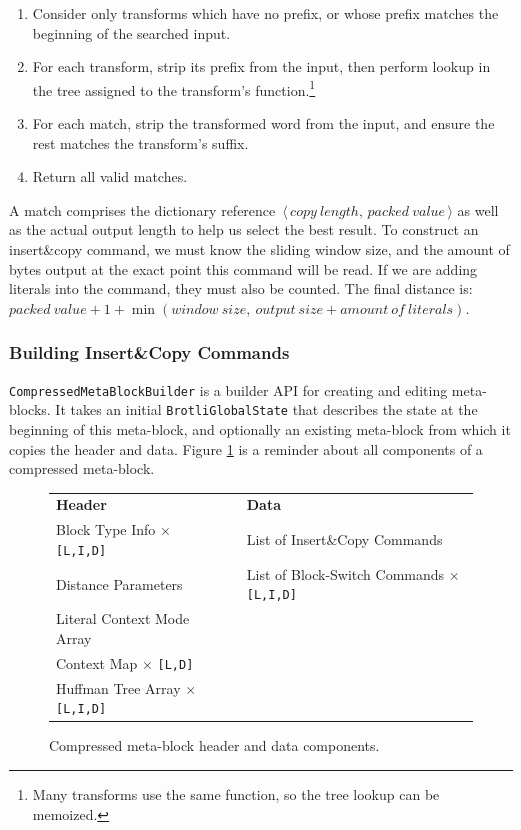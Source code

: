 \documentclass[english,master,dept460,male,cpp,cpdeclaration]{diploma}
\newcommand{\nosep}{\itemsep0em}
\newcommand{\pair}[2]{$\,\langle\,#1,\,#2\,\rangle$}
\begin{document}
			\begin{enumerate} \nosep
				\item Consider only transforms which have no prefix, or whose prefix matches the beginning of the searched input.
				\item For each transform, strip its prefix from the input, then perform lookup in the tree assigned to the transform's function.\footnote{Many transforms use the same function, so the tree lookup can be memoized.}
				\item For each match, strip the transformed word from the input, and ensure the rest matches the transform's suffix.
				\item Return all valid matches.
			\end{enumerate}
			
			\noindent
			A match comprises the dictionary reference \pair{copy\ length}{packed\ value} as well as the actual output length to help us select the best result. To construct an insert\&copy command, we must know the sliding window size, and the amount of bytes output at the exact point this command will be read. If we are adding literals into the command, they must also be counted. The final distance is: $packed\ value + 1 + \min (window\ size,\ output\ size + amount\ of\ literals)$.
		
		\subsubsection{Building Insert\&Copy Commands}
		\label{sec:building-insert-copy-commands}
		
		\verb|CompressedMetaBlockBuilder| is a builder API for creating and editing meta-blocks. It takes an initial \verb|BrotliGlobalState| that describes the state at the beginning of this meta-block, and optionally an existing meta-block from which it copies the header and data. Figure \ref{fig:compressed-meta-block-components-reminder} is a reminder about all components of a compressed meta-block.
		
		\begin{figure}[H]
			\centering
			\medskip
			
			\begin{tabular}{lcl}
				\textbf{Header} & & \textbf{Data} \\
				\addlinespace
				\cline{1-1} \cline{3-3}
				\addlinespace
				Block Type Info $\times$ \verb|[L,I,D]|    & & List of Insert\&Copy Commands \\
				Distance Parameters                        & & List of Block-Switch Commands $\times$ \verb|[L,I,D]| \\
				Literal Context Mode Array                 & & \\
				Context Map $\times$ \verb|[L,D]|          & & \\
				Huffman Tree Array $\times$ \verb|[L,I,D]| & & \\
			\end{tabular}
			
			\caption{Compressed meta-block header and data components.}
			\label{fig:compressed-meta-block-components-reminder}
		\end{figure}
		
\end{document}
